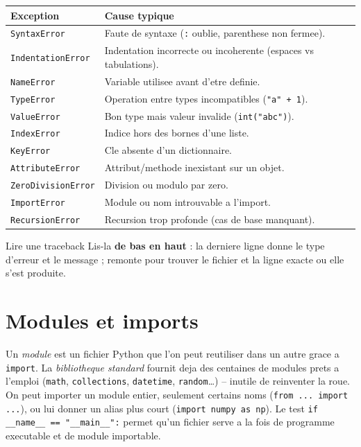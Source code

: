 \documentclass[11pt,a4paper]{article}
\begin{document}
\renewcommand{\arraystretch}{1.35}
\begin{longtable}{>{\raggedright\arraybackslash}p{4.2cm}
                  >{\raggedright\arraybackslash}p{8.6cm}}
\rowcolor{primary}
\textbf{\color{white}Exception} & \textbf{\color{white}Cause typique} \\
\hline
\texttt{SyntaxError}       & Faute de syntaxe (\texttt{:} oublie, parenthese non fermee). \\
\texttt{IndentationError}  & Indentation incorrecte ou incoherente (espaces vs tabulations). \\
\texttt{NameError}         & Variable utilisee avant d'etre definie. \\
\texttt{TypeError}         & Operation entre types incompatibles (\texttt{"a" + 1}). \\
\texttt{ValueError}        & Bon type mais valeur invalide (\texttt{int("abc")}). \\
\texttt{IndexError}        & Indice hors des bornes d'une liste. \\
\texttt{KeyError}          & Cle absente d'un dictionnaire. \\
\texttt{AttributeError}    & Attribut/methode inexistant sur un objet. \\
\texttt{ZeroDivisionError} & Division ou modulo par zero. \\
\texttt{ImportError}       & Module ou nom introuvable a l'import. \\
\texttt{RecursionError}    & Recursion trop profonde (cas de base manquant). \\
\end{longtable}

\begin{infobox}{Lire une traceback}
Lis-la \textbf{de bas en haut} : la derniere ligne donne le type d'erreur et le
message ; remonte pour trouver le fichier et la ligne exacte ou elle s'est
produite.
\end{infobox}

\section{Modules et imports}
Un \emph{module} est un fichier Python que l'on peut reutiliser dans un autre
grace a \texttt{import}. La \emph{bibliotheque standard} fournit deja des
centaines de modules prets a l'emploi (\texttt{math}, \texttt{collections},
\texttt{datetime}, \texttt{random}\ldots) -- inutile de reinventer la roue. On
peut importer un module entier, seulement certains noms (\texttt{from ... import
...}), ou lui donner un alias plus court (\texttt{import numpy as np}). Le test
\texttt{if \_\_name\_\_ == "\_\_main\_\_":} permet qu'un fichier serve a la fois
de programme executable et de module importable.
\end{document}

